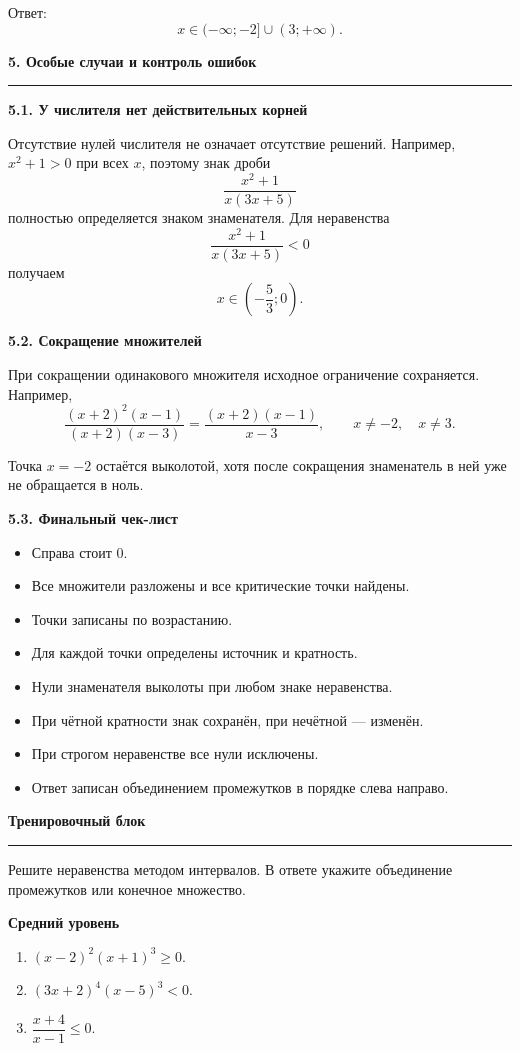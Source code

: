 \documentclass[a4paper,12pt]{article}
\newcommand{\sectiontitle}[1]{%
  \vspace{0.65em}
  {\Large\bfseries\textcolor{darkaccent}{#1}}\par
  \vspace{0.25em}
  {\color{accent}\rule{\linewidth}{0.5pt}}
  \vspace{0.45em}
}
\newcommand{\subsectiontitle}[1]{%
  \vspace{0.5em}
  {\large\bfseries\textcolor{darkaccent}{#1}}\par
  \vspace{0.2em}
}
\begin{document}
Ответ:
\[
\boxed{x\in(-\infty;-2]\cup(3;+\infty)}.
\]

\sectiontitle{5. Особые случаи и контроль ошибок}

\subsectiontitle{5.1. У числителя нет действительных корней}

Отсутствие нулей числителя не означает отсутствие решений. Например, $x^2+1>0$ при всех $x$, поэтому знак дроби
\[
\frac{x^2+1}{x(3x+5)}
\]
полностью определяется знаком знаменателя. Для неравенства
\[
\frac{x^2+1}{x(3x+5)}<0
\]
получаем
\[
\boxed{x\in\left(-\frac53;0\right)}.
\]

\subsectiontitle{5.2. Сокращение множителей}

При сокращении одинакового множителя исходное ограничение сохраняется. Например,
\[
\frac{(x+2)^2(x-1)}{(x+2)(x-3)}
=\frac{(x+2)(x-1)}{x-3},
\qquad x\ne-2,\quad x\ne3.
\]

Точка $x=-2$ остаётся выколотой, хотя после сокращения знаменатель в ней уже не обращается в ноль.

\subsectiontitle{5.3. Финальный чек-лист}

\begin{itemize}
  \item Справа стоит $0$.
  \item Все множители разложены и все критические точки найдены.
  \item Точки записаны по возрастанию.
  \item Для каждой точки определены источник и кратность.
  \item Нули знаменателя выколоты при любом знаке неравенства.
  \item При чётной кратности знак сохранён, при нечётной --- изменён.
  \item При строгом неравенстве все нули исключены.
  \item Ответ записан объединением промежутков в порядке слева направо.
\end{itemize}

\newpage
\sectiontitle{Тренировочный блок}

Решите неравенства методом интервалов. В ответе укажите объединение промежутков или конечное множество.

\subsectiontitle{Средний уровень}
\begin{enumerate}[label=\textbf{\arabic*.}]
  \item $(x-2)^2(x+1)^3\ge0$.
  \item $(3x+2)^4(x-5)^3<0$.
  \item $\dfrac{x+4}{x-1}\le0$.
\end{enumerate}
\end{document}
